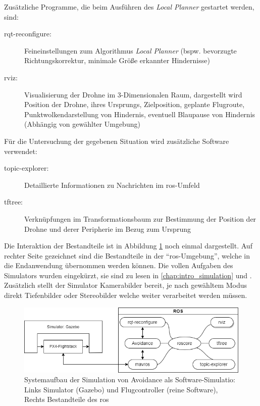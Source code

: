 Zusätzliche Programme, die beim Ausführen des \textit{Local Planner} gestartet werden, sind:
\begin{description}
    \item[rqt-reconfigure:] Feineinstellungen zum Algorithmus \textit{Local Planner} (bspw. bevorzugte Richtungskorrektur, minimale Größe erkannter Hindernisse)
    \item[rviz:] Visualisierung der Drohne im 3-Dimensionalen Raum, dargestellt wird Position der Drohne, ihres Ursprungs, Zielposition, geplante Flugroute, Punktwolkendarstellung von Hindernis, eventuell Blaupause von Hindernis (Abhängig von gewählter Umgebung)
\end{description}
Für die Untersuchung der gegebenen Situation wird zusätzliche Software verwendet:
\begin{description}
    \item[topic-explorer:] Detaillierte Informationen zu Nachrichten im \acrshort{ros}-Umfeld
    \item[tftree:] Verknüpfungen im Transformationsbaum zur Bestimmung der Position der Drohne und derer Peripherie im Bezug zum Ursprung 
\end{description}

Die Interaktion der Bestandteile ist in Abbildung \ref{fig:system_sim_origin} noch einmal dargestellt. Auf rechter Seite gezeichnet sind die Bestandteile in der \enquote{\acrshort{ros}-Umgebung}, welche in die Endanwendung übernommen werden können. Die vollen Aufgaben des Simulators wurden eingekürzt, sie sind zu lesen in \cref{chap:intro_simulation} und \cite[Kapitel 3.4.1]{markusreinErweiterungBestehenderDrohnen2023}. Zusätzlich stellt der Simulator Kamerabilder bereit, je nach gewähltem Modus direkt Tiefenbilder oder Stereobilder welche weiter verarbeitet werden müssen. 
\begin{figure}[!ht]
    \centering
    \includegraphics[width=\linewidth]{images/simulation_ros.drawio.png}
    \caption[Systemaufbau der Simulation von Avoidance als Software-Simulation]{Systemaufbau der Simulation von Avoidance als Software-Simulatio: Links Simulator (Gazebo) und Flugcontroller (reine Software), Rechts Bestandteile des \acrshort{ros}}
    \label{fig:system_sim_origin}
\end{figure}


